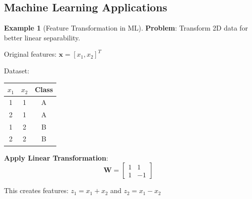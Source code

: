 \documentclass[12pt,a4paper]{article}
\theoremstyle{definition}
\newtheorem{example}{Example}[section]
\begin{document}
\subsection{Machine Learning Applications}

\begin{example}[Feature Transformation in ML]
\textbf{Problem}: Transform 2D data for better linear separability.

Original features: $\mathbf{x} = [x_1, x_2]^T$

Dataset:
\begin{center}
\begin{tabular}{|c|c|c|}
\hline
$x_1$ & $x_2$ & Class \\
\hline
1 & 1 & A \\
2 & 1 & A \\
1 & 2 & B \\
2 & 2 & B \\
\hline
\end{tabular}
\end{center}

\textbf{Apply Linear Transformation}:
\[
\mathbf{W} = \begin{bmatrix}
1 & 1 \\
1 & -1
\end{bmatrix}
\]

This creates features: $z_1 = x_1 + x_2$ and $z_2 = x_1 - x_2$


\end{example}
\end{document}
